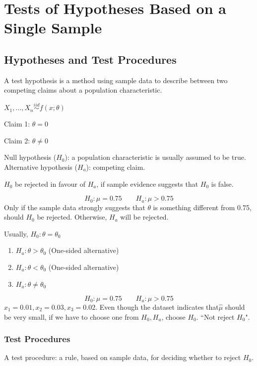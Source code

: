 \chapter[Tests of Hypotheses]{Tests of Hypotheses Based on a Single Sample}
\section{Hypotheses and Test Procedures}
A test hypothesis is a method using sample data to describe between two competing claims about a population characteristic.

\begin{exmp}
$X_1,\dots,X_n \overset{iid}{\sim} f(x;\theta)$

Claim 1: $\theta=0$

Claim 2: $\theta\neq 0$
\end{exmp}

\begin{defn}
Null hypothesis ($H_0$): a population characteristic is usually assumed to be true. Alternative hypothesis ($H_a$): competing claim.

$H_0$ be rejected in favour of $H_a$, if sample evidence suggests that $H_0$ is false.
\end{defn}

\begin{exmp}
\[H_0:\mu=0.75 \qquad H_a:\mu>0.75\]
Only if the sample data strongly suggests that $\theta$ is something different from 0.75, should $H_0$ be rejected. Otherwise, $H_a$ will be rejected.
\end{exmp}

Usually, $H_0:\theta=\theta_0$
\begin{enumerate}
\item $H_a:\theta > \theta_0$ (One-sided alternative)
\item $H_a:\theta <\theta_0$ (One-sided alternative)
\item $H_a:\theta \neq \theta_0$
\end{enumerate}

\begin{exmp}
\[H_0:\mu=0.75 \qquad H_a:\mu>0.75\]
$x_1=0.01,x_2=0.03,x_3=0.02$. Even though the dataset indicates that$\hat{\mu}$ should be very small, if we have to choose one from $H_0,H_a$, choose $H_0$. ``Not reject $H_0$".
\end{exmp}


\subsection{Test Procedures}
A test procedure: a rule, based on sample data, for deciding whether to reject $H_0$.


